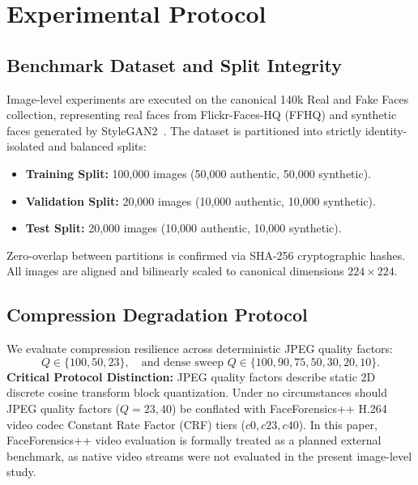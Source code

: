 \documentclass[11pt,a4paper]{article}
\begin{document}
\section{Experimental Protocol}
\label{sec:protocol}

\subsection{Benchmark Dataset and Split Integrity}
Image-level experiments are executed on the canonical 140k Real and Fake Faces collection, representing real faces from Flickr-Faces-HQ (FFHQ) and synthetic faces generated by StyleGAN2~\cite{karras2020analyzing}. The dataset is partitioned into strictly identity-isolated and balanced splits:
\begin{itemize}
    \item \textbf{Training Split:} 100,000 images (50,000 authentic, 50,000 synthetic).
    \item \textbf{Validation Split:} 20,000 images (10,000 authentic, 10,000 synthetic).
    \item \textbf{Test Split:} 20,000 images (10,000 authentic, 10,000 synthetic).
\end{itemize}
Zero-overlap between partitions is confirmed via SHA-256 cryptographic hashes. All images are aligned and bilinearly scaled to canonical dimensions $224 \times 224$.

\subsection{Compression Degradation Protocol}
We evaluate compression resilience across deterministic JPEG quality factors:
\begin{equation}
Q \in \{100, 50, 23\}, \quad \text{and dense sweep } Q \in \{100, 90, 75, 50, 30, 20, 10\}.
\end{equation}
\textbf{Critical Protocol Distinction:} JPEG quality factors describe static 2D discrete cosine transform block quantization. Under no circumstances should JPEG quality factors ($Q=23, 40$) be conflated with FaceForensics++ H.264 video codec Constant Rate Factor (CRF) tiers ($c0, c23, c40$). In this paper, FaceForensics++ video evaluation is formally treated as a planned external benchmark, as native video streams were not evaluated in the present image-level study.
\end{document}
